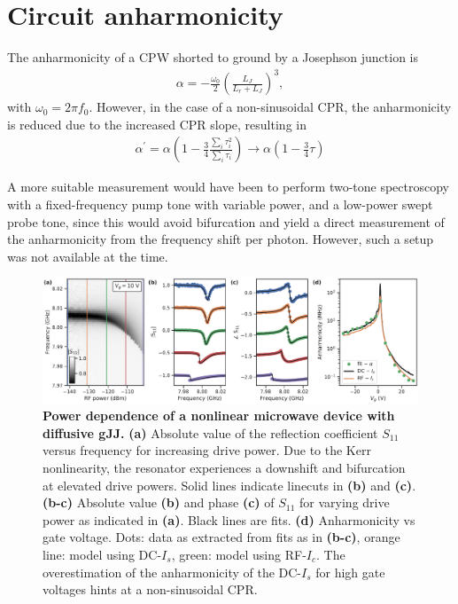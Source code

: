 \section{Circuit anharmonicity}

The anharmonicity of a CPW shorted to ground by a Josephson junction is
\begin{align}
\alpha=-\frac{\omega_0}{2} \left(\frac{L_J}{L_r+L_J}\right)^3,
\end{align}
\cite{wilsonPhotonGenerationElectromagnetic2010b,zhouHighgainWeaklyNonlinear2014}
%
with $\omega_0=2\pi f_0$.
%
However, in the case of a non-sinusoidal CPR, the anharmonicity is reduced due to the increased CPR slope, resulting in
\begin{align}
\alpha^\prime = \alpha \left( 1-\frac{3}{4}\frac{\sum_i\tau_i^2}{\sum_i\tau_i}\right) \rightarrow \alpha \left( 1-\frac{3}{4}\tau \right)
\end{align}
\cite{kringhojAnharmonicitySuperconductingQubit2018}

A more suitable measurement would have been to perform two-tone spectroscopy with a fixed-frequency pump tone with variable power, and a low-power swept probe tone, since this would avoid bifurcation and yield a direct measurement of the anharmonicity from the frequency shift per photon.
%
However, such a setup was not available at the time.

\begin{figure}
	\centering
	\includegraphics[width=\linewidth]{chapter-gJJ-CPR/figs/Figure4}
	\caption{
		\textbf{Power dependence of a nonlinear microwave device with diffusive gJJ.}
		\textbf{(a)} Absolute value of the reflection coefficient $S_{11}$ versus frequency for increasing drive power.
		Due to the Kerr nonlinearity, the resonator experiences a downshift and bifurcation at elevated drive powers.
		Solid lines indicate linecuts in \textbf{(b)} and \textbf{(c)}.
		\textbf{(b-c)} Absolute value \textbf{(b)} and phase \textbf{(c)} of $S_{11}$ for varying drive power as indicated in \textbf{(a)}.
		Black lines are fits.
		\textbf{(d)} Anharmonicity vs gate voltage.
		Dots: data as extracted from fits as in \textbf{(b-c)}, orange line: model using DC-$I_s$, green: model using RF-$I_c$.
		The overestimation of the anharmonicity of the DC-$I_s$ for high gate voltages hints at a non-sinusoidal CPR.
	}
	\label{fig:figure4}
\end{figure}

